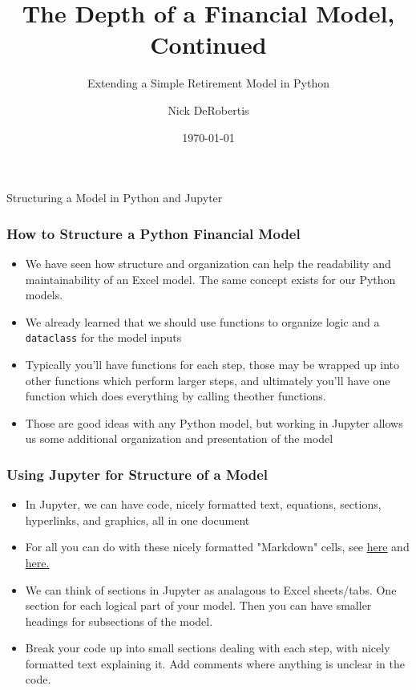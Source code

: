 \documentclass[handout, 11pt]{beamer}
\institute[UF]{\inst{1}
University of Florida\\
Department of Finance, Insurance, and Real Estate}
\begin{document}
\title[TVM Deep Dive Python]{The Depth of a Financial Model, Continued}
\subtitle{Extending a Simple Retirement Model in Python}
\author[DeRobertis]{Nick DeRobertis}
\date{\today}
\begin{frame}
\titlepage
\label{title-frame}
\end{frame}
\begin{section}{Structuring a Model in Python and Jupyter}
\begin{frame}
\frametitle{How to Structure a Python Financial Model}
\begin{itemize}
\item We have seen how structure and organization can help the readability and maintainability of an Excel model. The same concept exists for our Python models.
\vfill
\item We already learned that we should use functions to organize logic and a
\texttt{dataclass}
for the model inputs
\vfill
\item Typically you'll have functions for each step, those may be wrapped up into other functions which perform larger steps, and ultimately you'll have one function which does everything by calling theother functions.
\vfill
\item Those are good ideas with any Python model, but working in Jupyter allows us some additional organization and presentation of the model
\end{itemize}
\end{frame}
\begin{frame}
\frametitle{Using Jupyter for Structure of a Model}
\begin{itemize}
\item In Jupyter, we can have code, nicely formatted text, equations, sections, hyperlinks, and graphics, all in one document
\vfill
\item For all you can do with these nicely formatted "Markdown" cells, see
\textcolor{blue}{\underline{\href{https://www.markdownguide.org/basic-syntax/}{here}}}
and
\textcolor{blue}{\underline{\href{https://www.markdownguide.org/extended-syntax/}{here.}}}
\vfill
\item We can think of sections in Jupyter as analagous to Excel sheets/tabs. One section for each logical part of your model. Then you can have smaller headings for subsections of the model.
\vfill
\item Break your code up into small sections dealing with each step, with nicely formatted text explaining it. Add comments where anything is unclear in the code.

\end{itemize}
\end{frame}
\end{section}
\end{document}
